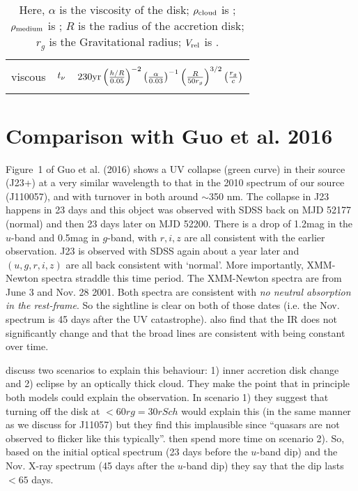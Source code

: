 \documentclass[11pt,a4paper]{article}
\begin{document}
\begin{table}
\begin{tabular}{ l c c }
&& \\
viscous                     & $t_{\rm \nu}$             & $230 {\rm yr}
                                                                         \left( \frac{h/R}{0.05}  \right)^{-2}
                                                                         \left( \frac{\alpha}{0.03}  \right)^{-1}
                                                                        \left( \frac{R}{50 r_{g}}  \right)^{3/2}
                                                                      \left( \frac{ r_{g}}{c} \right)$\\
&& \\
\hline \hline
    \end{tabular}
    \caption{Here, $\alpha$ is the viscosity of the disk; $\rho_{\rm cloud}$ is ; $\rho_{\rm medium}$ is  ;
      $R$ is the radius of the accretion disk; $r_{g}$ is the Gravitational radius; 
      $V_{\rm rel}$ is .}
    \label{tab:timescales}
    \centering
  \end{table}


\section*{Comparison with Guo et al. 2016}
Figure~1 of Guo et al. (2016) shows a UV collapse (green curve) in
their source (J23+) at a very similar wavelength to that in the 2010
spectrum of our source (J110057), and with turnover in both around
$\sim$350 nm.  The collapse in J23 happens in 23 days \citep[Figure 2
of ][]{Guo2016} and this object was observed with SDSS back on MJD
52177 (normal) and then 23 days later on MJD 52200. There is a drop of
1.2mag in the $u$-band and 0.5mag in $g$-band, with $r,i,z$ are all
consistent with the earlier observation. J23 is observed with SDSS
again about a year later and $(u,g,r,i,z)$ are all back consistent
with `normal'. More importantly, XMM-Newton spectra straddle this time
period. The XMM-Newton spectra are from June 3 and Nov. 28 2001. Both
spectra are consistent with {\it no neutral absorption in the
rest-frame}. So the sightline is clear on both of those dates
(i.e. the Nov. spectrum is 45 days after the UV
catastrophe). \citet{Guo2016} also find that the IR does not
significantly change and that the broad lines are consistent with
being constant over time.

\citet{Guo2016} discuss two scenarios to explain this behaviour: 1)
inner accretion disk change and 2) eclipse by an optically thick
cloud. They make the point that in principle both models could explain
the observation. In scenario 1) they suggest that turning off the disk
at $< 60rg = 30 rSch$ would explain this (in the same manner as we
discuss for J11057) but they find this implausible since ``quasars are
not observed to flicker like this typically''.  \citet{Guo2016} then
spend more time on scenario 2). So, based on the initial optical
spectrum (23 days before the $u$-band dip) and the Nov. X-ray spectrum
(45 days after the $u$-band dip) they say that the dip lasts $< 65$
days.





\end{document}
